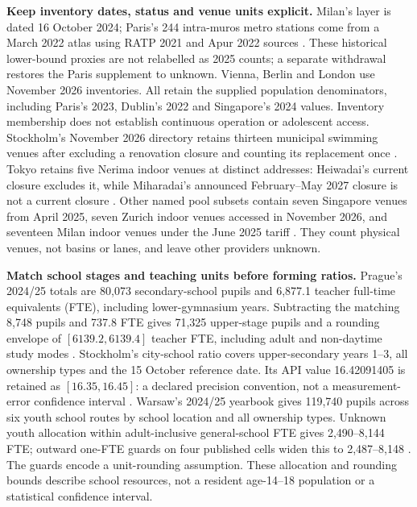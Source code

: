 \textbf{Keep inventory dates, status and venue units explicit.}
Milan's layer is dated 16 October 2024; Paris's 244 intra-muros metro stations
come from a March 2022 atlas using RATP 2021 and Apur 2022 sources
\cite{milanmetro,apur}. These historical lower-bound proxies are not relabelled
as 2025 counts; a separate withdrawal restores the Paris supplement to unknown.
Vienna, Berlin and London use November 2026 inventories. All retain the supplied
population denominators, including Paris's 2023, Dublin's 2022 and
Singapore's 2024 values. Inventory membership
does not establish continuous operation or adolescent access.
Stockholm's November 2026 directory retains thirteen municipal swimming venues after excluding a
renovation closure and counting its replacement once \cite{stockpool}.
Tokyo retains five Nerima indoor venues at distinct addresses: Heiwadai's
current closure excludes it, while Miharadai's announced February--May 2027
closure is not a current closure \cite{nerimapool,nerimaclose}.
Other named pool subsets contain seven Singapore venues from April 2025,
seven Zurich indoor venues accessed in November 2026, and seventeen Milan
indoor venues under the June 2025 tariff \cite{sgpool_2025,zurichpool,milanpool2025}.
They count physical venues, not basins or lanes, and leave other providers unknown.

\textbf{Match school stages and teaching units before forming ratios.}
Prague's 2024/25 totals are 80,073 secondary-school pupils and 6,877.1
teacher full-time equivalents (FTE), including lower-gymnasium years. Subtracting the matching
8,748 pupils and 737.8 FTE gives 71,325 upper-stage pupils and
a rounding envelope of $[6139.2,6139.4]$ teacher FTE, including adult and non-daytime study modes
\cite{prague}. Stockholm's city-school ratio covers upper-secondary years 1--3, all ownership
types and the 15 October reference date. Its API value 16.42091405 is retained
as $[16.35,16.45]$: a declared precision convention, not a measurement-error
confidence interval \cite{kolada}.
Warsaw's 2024/25 yearbook gives 119,740 pupils across six youth school routes
by school location and all ownership types. Unknown youth allocation within
adult-inclusive general-school FTE gives 2,490--8,144 FTE; outward one-FTE
guards on four published cells widen this to 2,487--8,148 \cite{warsawedu2025}.
The guards encode a unit-rounding assumption. These allocation and rounding
bounds describe school resources, not a resident age-14--18 population or a
statistical confidence interval.

